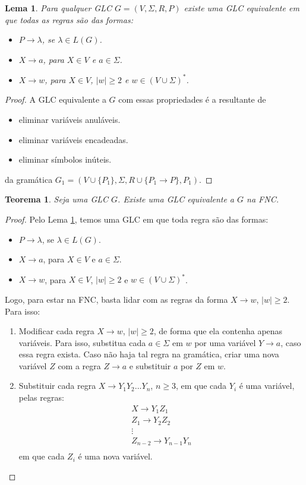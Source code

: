 \documentclass[a4paper]{article}
\newtheorem{Lemma}{Lema}
\newtheorem{Theorem}{Teorema}
\theoremstyle{definition}
\begin{document}
  \begin{Lemma}\label{lema1}
    Para qualquer GLC $G = (V,\Sigma,R,P)$ existe uma GLC equivalente em que
    todas as regras são das formas:
    \begin{itemize}
      \item $P \to \lambda$, se $\lambda \in L(G)$.
      \item $X \to a$, para $X \in V$ e $a \in \Sigma$.
      \item $X \to w$, para $X \in V$, $|w|\geq 2$ e $w \in (V\cup\Sigma)^*$.
    \end{itemize}
  \end{Lemma}
  \begin{proof}
    A GLC equivalente a $G$ com essas propriedades é a resultante de
    \begin{itemize}
       \item eliminar variáveis anuláveis.
       \item eliminar variáveis encadeadas.
       \item eliminar símbolos inúteis.
    \end{itemize}
    da gramática $G_1 = (V \cup \{P_1\}, \Sigma, R\cup \{P_1 \to P\}, P_1)$.   
  \end{proof}
  \begin{Theorem}\label{thmfnc}
    Seja uma GLC $G$. Existe uma GLC equivalente a $G$ na FNC.
  \end{Theorem}
  \begin{proof}
    Pelo Lema \ref{lema1}, temos uma GLC em que toda regra são das formas:
    \begin{itemize}
      \item $P \to \lambda$, se $\lambda \in L(G)$.
      \item $X \to a$, para $X \in V$ e $a \in \Sigma$.
      \item $X \to w$, para $X \in V$, $|w|\geq 2$ e $w \in (V\cup\Sigma)^*$.
    \end{itemize}
    Logo, para estar na FNC, basta lidar com as regras da forma $X \to w$, $|w|
    \geq 2$. Para isso:
    \begin{enumerate}
      \item Modificar cada regra $X \to w$, $|w|\geq 2$, de forma que ela
        contenha apenas variáveis. Para isso, substitua cada $a\in \Sigma$ em
        $w$ por uma variável $Y \to a$, caso essa regra exista. Caso não haja
        tal regra na gramática, criar uma nova variável $Z$ com a regra $Z \to
        a$ e substituir $a$ por $Z$ em $w$.
      \item Substituir cada regra $X \to Y_1Y_2...Y_n$, $n \geq 3$, em que cada
        $Y_i$ é uma variável, pelas regras:
        \[
          \begin{array}{l}
            X \to Y_1 Z_1\\
            Z_1 \to Y_2Z_2 \\
            \vdots \\
            Z_{n - 2} \to Y_{n - 1}Y_n\\
          \end{array}
        \]
        em que cada $Z_i$ é uma nova variável.
    \end{enumerate}
  \end{proof}
\end{document}
